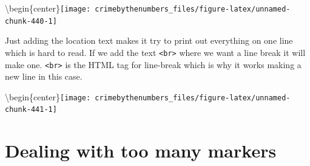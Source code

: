 \documentclass[
]{krantz}
\makeatletter
\newenvironment{Shaded}{\begin{snugshade}}{\end{snugshade}}
\newcommand{\AttributeTok}[1]{\textcolor[rgb]{0.61,0.61,0.61}{#1}}
\newcommand{\DecValTok}[1]{\textcolor[rgb]{0.06,0.06,0.06}{#1}}
\newcommand{\FunctionTok}[1]{\textcolor[rgb]{0,0,0}{#1}}
\newcommand{\NormalTok}[1]{#1}
\newcommand{\SpecialCharTok}[1]{\textcolor[rgb]{0,0,0}{#1}}
\newcommand{\StringTok}[1]{\textcolor[rgb]{0.5,0.5,0.5}{#1}}
\newenvironment{kframe}{%
\medskip{}
\setlength{\fboxsep}{.8em}
 \def\at@end@of@kframe{}%
 \ifinner\ifhmode%
  \def\at@end@of@kframe{\end{minipage}}%
  \begin{minipage}{\columnwidth}%
 \fi\fi%
 \def\FrameCommand##1{\hskip\@totalleftmargin \hskip-\fboxsep
 \colorbox{shadecolor}{##1}\hskip-\fboxsep
     \hskip-\linewidth \hskip-\@totalleftmargin \hskip\columnwidth}%
 \MakeFramed {\advance\hsize-\width
   \@totalleftmargin\z@ \linewidth\hsize
   \@setminipage}}%
 {\par\unskip\endMakeFramed%
 \at@end@of@kframe}
\renewenvironment{Shaded}{\begin{kframe}}{\end{kframe}}
\makeatother
\begin{document}
\textbackslash begin\{center\}\texttt{[image: crimebythenumbers\_files/figure-latex/unnamed-chunk-440-1]}

Just adding the location text makes it try to print out everything on one line which is hard to read. If we add the text \texttt{\textless{}br\textgreater{}} where we want a line break it will make one. \texttt{\textless{}br\textgreater{}} is the HTML tag for line-break which is why it works making a new line in this case.

\begin{Shaded}
\end{Shaded}

\textbackslash begin\{center\}\texttt{[image: crimebythenumbers\_files/figure-latex/unnamed-chunk-441-1]}

\hypertarget{dealing-with-too-many-markers}{%
\section{Dealing with too many markers}\label{dealing-with-too-many-markers}}
\end{document}
